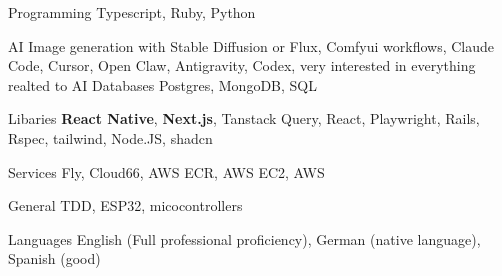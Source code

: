 

\begin{cvskills}

  \cvskill
    {Programming} %
    {Typescript, Ruby, Python } %

  \cvskill
    {AI} %
    {Image generation with Stable Diffusion or Flux, Comfyui workflows, Claude Code, Cursor, Open Claw, Antigravity, Codex, very interested in everything realted to AI} %
  \cvskill
    {Databases} %
    {Postgres, MongoDB, SQL} %

  \cvskill
    {Libaries} %
    {\textbf{React Native}, \textbf{Next.js}, Tanstack Query, React, Playwright, Rails, Rspec, tailwind, Node.JS, shadcn } %

  \cvskill
    {Services} %
    {Fly, Cloud66, AWS ECR, AWS EC2, AWS  } %

  \cvskill
    {General} %
    {TDD, ESP32, micocontrollers} %

  \cvskill
    {Languages} %
    {English (Full professional proficiency), German (native language), Spanish (good)} %

\end{cvskills}
